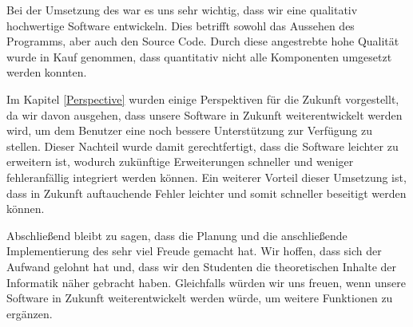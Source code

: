 Bei der Umsetzung des \gtitools war es uns sehr wichtig, dass wir eine
qualitativ hochwertige Software entwickeln. Dies betrifft sowohl das
Aussehen des Programms, aber auch den Source Code. Durch diese angestrebte hohe
Qualität wurde in Kauf genommen, dass quantitativ nicht alle Komponenten
umgesetzt werden konnten.\vspace{10pt}

Im Kapitel \ref{Perspective} wurden einige Perspektiven für die Zukunft
vorgestellt, da wir davon ausgehen, dass unsere Software in Zukunft
weiterentwickelt werden wird, um dem Benutzer eine noch bessere Unterstützung zur
Verfügung zu stellen. Dieser Nachteil wurde damit gerechtfertigt, dass die
Software leichter zu erweitern ist, wodurch zukünftige Erweiterungen schneller
und weniger fehleranfällig integriert werden können. Ein weiterer Vorteil dieser
Umsetzung ist, dass in Zukunft auftauchende Fehler leichter und somit schneller
beseitigt werden können.\vspace{10pt}

Abschließend bleibt zu sagen, dass die Planung und die anschließende
Implementierung des \gtitools sehr viel Freude gemacht hat. Wir hoffen, dass sich
der Aufwand gelohnt hat und, dass wir den Studenten die theoretischen Inhalte der
Informatik näher gebracht haben. Gleichfalls würden wir uns freuen, wenn unsere
Software in Zukunft weiterentwickelt werden würde, um weitere Funktionen zu
ergänzen.\vspace{10pt}



